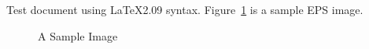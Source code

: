 


Test document using \LaTeX2.09 syntax. Figure~\ref{fig:sample} is a
sample EPS image.

\begin{figure}
\centerline{}
\caption{A Sample Image}
\label{fig:sample}
\end{figure}


